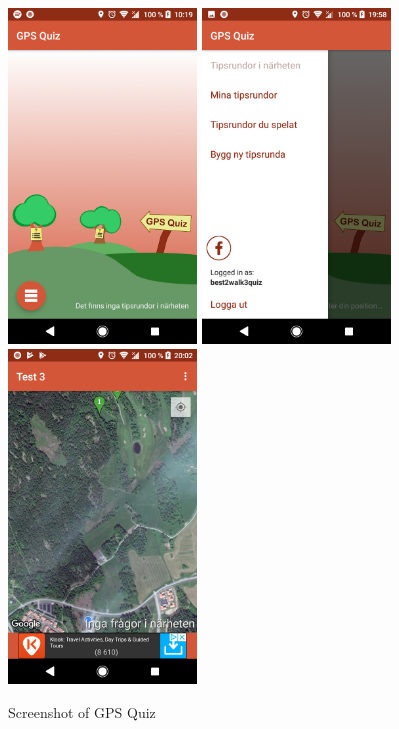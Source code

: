 \documentclass{TDP003mall}
\begin{document}
\begin{figure}[H]
\includegraphics[width=5cm]{pictures/Screenshot_GPS1}
\includegraphics[width=5cm]{pictures/Screenshot_GPS2}
\includegraphics[width=5cm]{pictures/Screenshot_GPS3}
\centering
\caption{Screenshot of GPS Quiz}
\end{figure}
\end{document}
